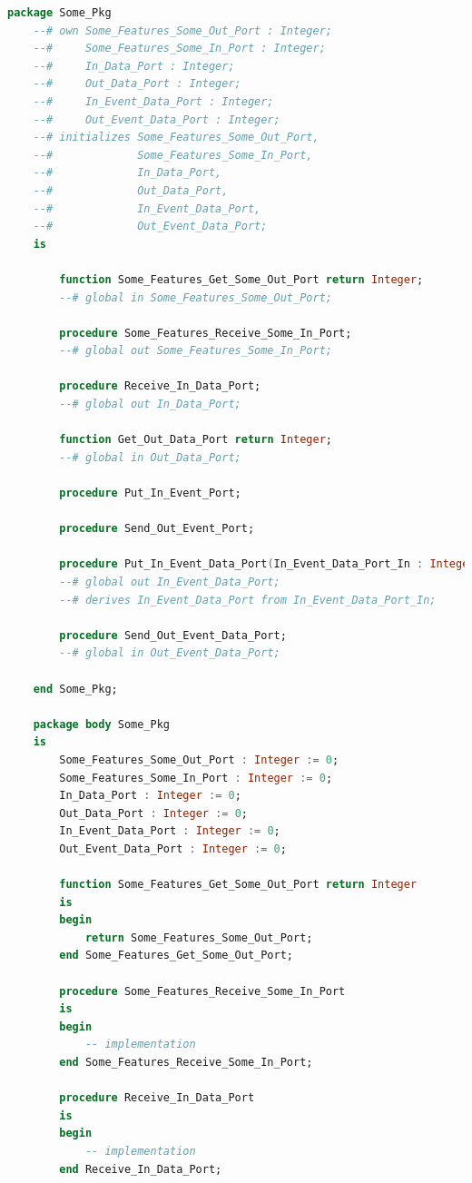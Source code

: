 \singlespacing
\begin{lstlisting}[language=ada, frame=single, gobble=0, caption={Translation of sample AADL package from listing \ref{lst:aadl_sample}}, label={lst:package_mapping}]
	package Some_Pkg
	--# own Some_Features_Some_Out_Port : Integer;
	--#     Some_Features_Some_In_Port : Integer;
	--#     In_Data_Port : Integer;
	--#     Out_Data_Port : Integer;
	--#     In_Event_Data_Port : Integer;
	--#     Out_Event_Data_Port : Integer;
	--# initializes Some_Features_Some_Out_Port,
	--#             Some_Features_Some_In_Port,
	--#             In_Data_Port,
	--#             Out_Data_Port,
	--#             In_Event_Data_Port,
	--#             Out_Event_Data_Port;
	is

	    function Some_Features_Get_Some_Out_Port return Integer;
	    --# global in Some_Features_Some_Out_Port;

	    procedure Some_Features_Receive_Some_In_Port;
	    --# global out Some_Features_Some_In_Port;

	    procedure Receive_In_Data_Port;
	    --# global out In_Data_Port;

	    function Get_Out_Data_Port return Integer;
	    --# global in Out_Data_Port;

	    procedure Put_In_Event_Port;

	    procedure Send_Out_Event_Port;

	    procedure Put_In_Event_Data_Port(In_Event_Data_Port_In : Integer);
	    --# global out In_Event_Data_Port;
	    --# derives In_Event_Data_Port from In_Event_Data_Port_In;

	    procedure Send_Out_Event_Data_Port;
	    --# global in Out_Event_Data_Port;

	end Some_Pkg;

	package body Some_Pkg
	is
	    Some_Features_Some_Out_Port : Integer := 0;
	    Some_Features_Some_In_Port : Integer := 0;
	    In_Data_Port : Integer := 0;
	    Out_Data_Port : Integer := 0;
	    In_Event_Data_Port : Integer := 0;
	    Out_Event_Data_Port : Integer := 0;

	    function Some_Features_Get_Some_Out_Port return Integer
	    is
	    begin
	        return Some_Features_Some_Out_Port;
	    end Some_Features_Get_Some_Out_Port;

	    procedure Some_Features_Receive_Some_In_Port
	    is
	    begin
	        -- implementation
	    end Some_Features_Receive_Some_In_Port;

	    procedure Receive_In_Data_Port
	    is
	    begin
	        -- implementation
	    end Receive_In_Data_Port;


\end{lstlisting}
